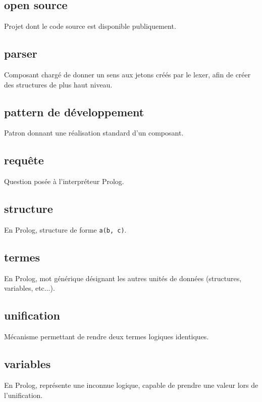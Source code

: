 \documentclass[../report.tex]{subfiles}
\begin{document}
\subsection*{open source}
Projet dont le code source est disponible publiquement.
\subsection*{parser}
Composant chargé de donner un sens aux jetons créés par le lexer, afin de créer des structures de plus haut niveau.
\subsection*{pattern de développement}
Patron donnant une réalisation standard d'un composant.
\subsection*{requête}
Question posée à l'interpréteur Prolog.
\subsection*{structure}
En Prolog, structure de forme \texttt{a(b, c)}.
\subsection*{termes}
En Prolog, mot générique désignant les autres unités de données (structures, variables, etc...).
\subsection*{unification}
Mécanisme permettant de rendre deux termes logiques identiques.
\subsection*{variables}
En Prolog, représente une inconnue logique, capable de prendre une valeur lors de l'unification.
\end{document}
